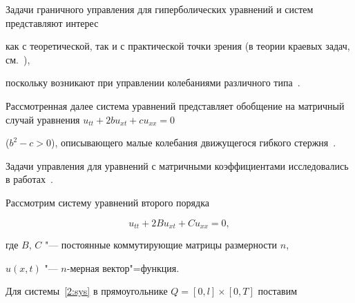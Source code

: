 


\date{19/XI/2012}





\maketitle




Задачи граничного управления для гиперболических уравнений и систем представляют интерес

как с теоретической, так и с практической точки зрения (в теории краевых задач, см.~\cite{kozlova:bib:Ptashnik}), 

поскольку возникают при управлении колебаниями различного типа~\cite{kozlova:bib:Butkovskii}.

Рассмотренная далее система уравнений представляет обобщение на матричный случай уравнения $u_{tt}+2bu_{xt}+cu_{xx}=0$

($b^2-c>0$), описывающего малые колебания движущегося гибкого стержня~\cite{kozlova:bib:Svetlickii,kozlova:bib:Skorobogat'ko}.

Задачи управления для уравнений с матричными коэффициентами исследовались в работах~\cite{kozlova:bib:Andreev_Lexina,kozlova:bib:Avdonin}.



Рассмотрим систему уравнений второго порядка

\begin{equation}

\label{2:sys}

u_{tt}+2Bu_{xt}+Cu_{xx}=0,

\end{equation}

где $B$, $C$ "--- постоянные коммутирующие матрицы размерности $n$,

$u(x,t)$ "--- $n$-мерная вектор"=функция.



Для системы~\eqref{2:sys} в прямоугольнике $Q=[0,l] \times [0,T]$ поставим

